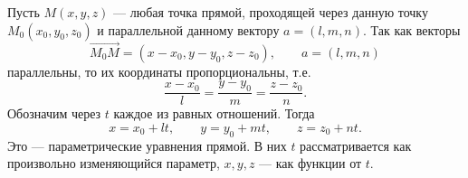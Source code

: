 \begin{rusblock}
Пусть $M(x,y,z)$ --- любая точка прямой, проходящей через данную точку $M_0(x_0,y_0,z_0)$ и параллельной данному вектору $a=(l,m,n)$. Так как векторы
\[
\overrightarrow{M_0M}=(x-x_0,y-y_0,z-z_0),\qquad a=(l,m,n)
\]
параллельны, то их координаты пропорциональны, т.е.
\[
\frac{x-x_0}{l}=\frac{y-y_0}{m}=\frac{z-z_0}{n}.
\]
Обозначим через $t$ каждое из равных отношений. Тогда
\[
x=x_0+lt,\qquad y=y_0+mt,\qquad z=z_0+nt.
\]
Это --- параметрические уравнения прямой. В них $t$ рассматривается как произвольно изменяющийся параметр, $x,y,z$ --- как функции от $t$.
\end{rusblock}

